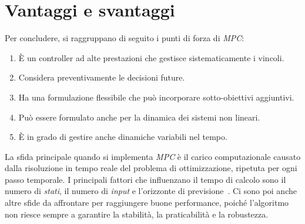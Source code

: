 \section{Vantaggi e svantaggi}
Per concludere, si raggruppano di seguito i punti di forza di \textit{MPC}:
\begin{enumerate}
    \item È un controller ad alte prestazioni che gestisce sistematicamente i vincoli.
    \item Considera preventivamente le decisioni future. 
    \item Ha una formulazione flessibile che può incorporare sotto-obiettivi aggiuntivi.
    \item Può essere formulato anche per la dinamica dei sistemi non lineari.
    \item È in grado di gestire anche dinamiche variabili nel tempo.
\end{enumerate}
La sfida principale quando si implementa \textit{MPC} è il carico 
computazionale causato dalla risoluzione in tempo reale
del problema di ottimizzazione, ripetuta per ogni passo temporale. I principali fattori che 
influenzano il tempo di calcolo sono il numero di \textit{stati}, il numero di \textit{input} e 
l’orizzonte di previsione~\cite{hierarchmpc}. Ci sono poi anche altre sfide da affrontare per 
raggiungere buone performance, poiché l'algoritmo non riesce sempre a garantire la stabilità, la praticabilità e la robustezza.